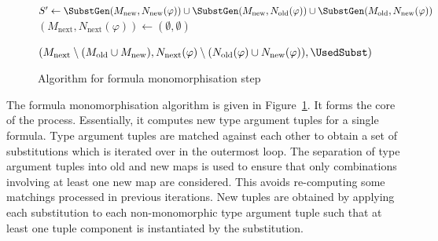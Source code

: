 \documentclass[runningheads]{llncs}
\begin{document}
\begin{figure}[t!]
\begin{algorithm}[H]
{   $S' \leftarrow \SubstGen(M_{\text{new}}, N_{\text{new}}(\varphi))
   \cup \SubstGen(M_{\text{new}}, N_{\text{old}}(\varphi))
   \cup \SubstGen(M_{\text{old}}, N_{\text{new}}(\varphi))$\;
   \((M_\text{next}, N_\text{next}(\varphi)) \leftarrow (\emptyset, \emptyset)\)\;

   \BlankLine

   \Return \((M_{\text{next}}\setminus (M_{\text{old}} \cup M_{\text{new}}), N_{\text{next}}(\varphi)\setminus (N_{\text{old}}(\varphi)\cup N_{\text{new}}(\varphi)), \UsedSubst)\)
}

\end{algorithm}
\caption{Algorithm for formula monomorphisation step}
\label{mono_step}
\end{figure}


The formula monomorphisation algorithm is given in Figure~\ref{mono_step}. It forms the core of the process. Essentially, it computes new type argument tuples for a single formula. Type argument tuples are matched against each other to obtain a set of substitutions which is iterated over in the outermost loop. 
The separation of type argument tuples into old and new maps is used to ensure that only combinations involving at least one new map are considered. This avoids re-computing some matchings processed in previous iterations. %
New tuples are obtained by applying
each substitution to each non-monomorphic type argument tuple such that at least one tuple component is instantiated by the substitution.
\end{document}
